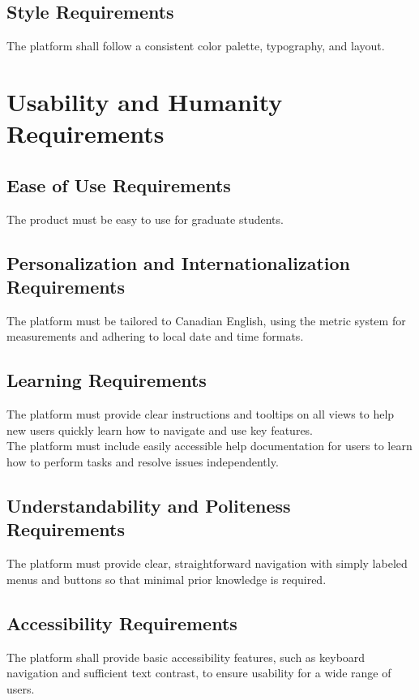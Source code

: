 \documentclass[12pt]{article}
\begin{document}
\subsection{Style Requirements}
The platform shall follow a consistent color palette, typography, and layout.

\section{Usability and Humanity Requirements}
\subsection{Ease of Use Requirements}
The product must be easy to use for graduate students.

\subsection{Personalization and Internationalization Requirements}
The platform must be tailored to Canadian English, using the metric system for measurements and adhering to local date and time formats.

\subsection{Learning Requirements}
The platform must provide clear instructions and tooltips on all views to help new users quickly learn how to navigate and use key features.\\

\noindent The platform must include easily accessible help documentation for users to learn how to perform tasks and resolve issues independently.


\subsection{Understandability and Politeness Requirements}
The platform must provide clear, straightforward navigation with simply labeled menus and buttons so that minimal prior knowledge is required.

\subsection{Accessibility Requirements}
The platform shall provide basic accessibility features, such as keyboard navigation and sufficient text contrast, to ensure usability for a wide range of users.
\end{document}
